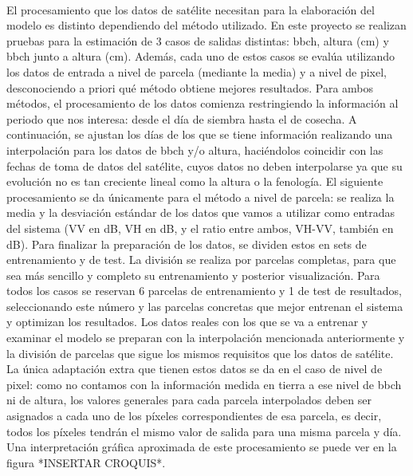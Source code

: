\\
\par  El procesamiento que los datos de satélite necesitan para la elaboración del modelo es distinto dependiendo del método utilizado. En este proyecto se realizan pruebas para la estimación de 3 casos de salidas distintas: \gls{bbch}, altura (cm) y \gls{bbch} junto a altura (cm). Además, cada uno de estos casos se evalúa utilizando los datos de entrada a nivel de parcela (mediante la media) y a nivel de pixel, desconociendo a priori qué método obtiene mejores resultados. Para ambos métodos, el procesamiento de los datos comienza restringiendo la información al periodo que nos interesa: desde el día de siembra hasta el de cosecha. A continuación, se ajustan los días de los que se tiene información realizando una interpolación para los datos de \gls{bbch} y/o altura, haciéndolos coincidir con las fechas de toma de datos del satélite, cuyos datos no deben interpolarse ya que su evolución no es tan creciente lineal como la altura o la fenología. El siguiente procesamiento se da únicamente para el método a nivel de parcela: se realiza la media y la desviación estándar de los datos que vamos a utilizar como entradas del sistema (VV en dB, VH en dB, y el ratio entre ambos, VH-VV, también en dB). Para finalizar la preparación de los datos, se dividen estos en sets de entrenamiento y de test. La división se realiza por parcelas completas, para que sea más sencillo y completo su entrenamiento y posterior visualización. Para todos los casos se reservan 6 parcelas de entrenamiento y 1 de test de resultados, seleccionando este número y las parcelas concretas que mejor entrenan el sistema y optimizan los resultados. Los datos reales con los que se va a entrenar y examinar el modelo se preparan con la interpolación mencionada anteriormente y la división de parcelas que sigue los mismos requisitos que los datos de satélite. La única adaptación extra que tienen estos datos se da en el caso de nivel de pixel: como no contamos con la información medida en tierra a ese nivel de \gls{bbch} ni de altura, los valores generales para cada parcela interpolados deben ser asignados a cada uno de los píxeles correspondientes de esa parcela, es decir, todos los píxeles tendrán el mismo valor de salida para una misma parcela y día. Una interpretación gráfica aproximada de este procesamiento se puede ver en la figura *INSERTAR CROQUIS*.
\\
